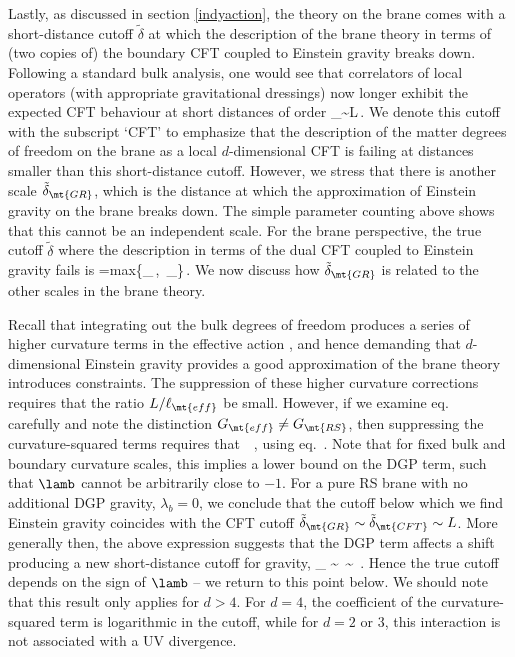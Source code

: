 Lastly, as discussed in section \ref{indyaction},  the theory on the brane comes with a short-distance cutoff $\tilde \delta$ \cite{deHaro:2000vlm,Emparan:2006ni,Myers:2013lva} at which the description of the brane theory in terms of (two copies of) the boundary CFT coupled to Einstein gravity breaks down. Following a standard bulk analysis, one would see that correlators of local operators (with appropriate gravitational dressings) now longer exhibit the expected CFT behaviour at short distances of order 
\beq
\tilde\delta_\sim L\,.
\label{ctoff2}
\eeq
We denote this cutoff with the subscript `CFT' to emphasize that the description of the matter degrees of freedom on the brane as a local $d$-dimensional CFT is failing at distances smaller than this short-distance cutoff. However, we stress that there is another scale $\tilde \delta_\mt{GR}$, which is the distance at which the approximation of Einstein gravity on the brane breaks down. The simple parameter counting above shows that this cannot be an independent scale. For the brane perspective, the true cutoff $\tilde \delta$ where the description in terms of the dual CFT coupled to Einstein gravity fails is 
\beq\label{ctoff}
\tilde \delta={\rm max}\left\{\tilde \delta_\,,\ \tilde \delta_\right\}\,.
\eeq
We now discuss how $\tilde \delta_\mt{GR}$ is related to the other scales in the brane theory.

Recall that integrating out the bulk degrees of freedom produces a series of higher curvature terms in the effective action , and hence demanding that $d$-dimensional Einstein gravity provides a good approximation of the brane theory introduces constraints. The suppression of these higher curvature corrections requires that the ratio $L/\ell_\mt{eff}$ be small. However, if we examine eq.~ carefully and note the distinction $G_\mt{eff}\ne G_\mt{RS}$, then suppressing the curvature-squared terms requires that
\beq
{}\,
\,,
\label{lmfao}
\eeq
using eq.~. Note that for fixed bulk and boundary curvature scales, this implies a lower bound on the DGP term, such that $\lamb$ cannot be arbitrarily close to $-1$. For a pure RS brane with no additional DGP gravity, \ie $\lambda_b=0$, we conclude that the cutoff below which we find Einstein gravity coincides with the CFT cutoff $\tilde\delta_\mt{GR} \sim \tilde\delta_\mt{CFT}\sim L$. More generally then, the above expression suggests that the DGP term  affects a shift producing a new short-distance cutoff for gravity,
\beq
\tilde\delta_ \sim {}\ \sim
{}\,.
\label{haiku}
\eeq
Hence the true cutoff  depends on the sign of $\lamb$ -- we return to this point below. We should note that this result only applies for $d>4$. For $d=4$, the coefficient of the curvature-squared term is logarithmic in the cutoff, while for $d=2$ or $3$, this interaction is not associated with a UV divergence. 


